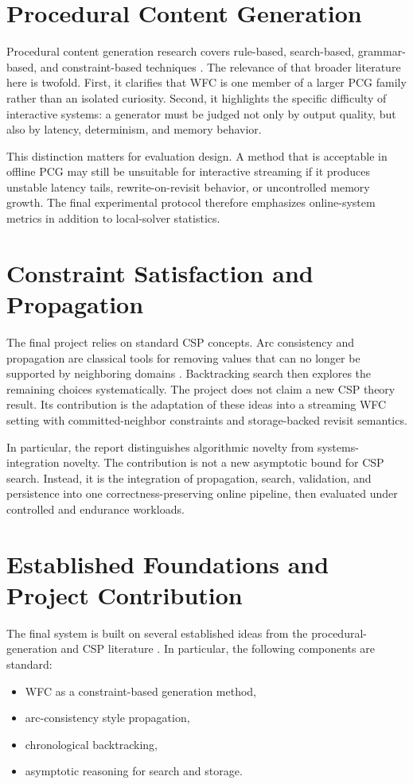 \documentclass[12pt,a4paper]{report}
\begin{document}
\section{Procedural Content Generation}
Procedural content generation research covers rule-based, search-based, grammar-based, and constraint-based techniques \cite{shaker2016pcg}. The relevance of that broader literature here is twofold. First, it clarifies that WFC is one member of a larger PCG family rather than an isolated curiosity. Second, it highlights the specific difficulty of interactive systems: a generator must be judged not only by output quality, but also by latency, determinism, and memory behavior.

This distinction matters for evaluation design. A method that is acceptable in offline PCG may still be unsuitable for interactive streaming if it produces unstable latency tails, rewrite-on-revisit behavior, or uncontrolled memory growth. The final experimental protocol therefore emphasizes online-system metrics in addition to local-solver statistics.

\section{Constraint Satisfaction and Propagation}
The final project relies on standard CSP concepts. Arc consistency and propagation are classical tools for removing values that can no longer be supported by neighboring domains \cite{mackworth1977consistency,dechter2003constraint}. Backtracking search then explores the remaining choices systematically. The project does not claim a new CSP theory result. Its contribution is the adaptation of these ideas into a streaming WFC setting with committed-neighbor constraints and storage-backed revisit semantics.

In particular, the report distinguishes algorithmic novelty from systems-integration novelty. The contribution is not a new asymptotic bound for CSP search. Instead, it is the integration of propagation, search, validation, and persistence into one correctness-preserving online pipeline, then evaluated under controlled and endurance workloads.

\section{Established Foundations and Project Contribution}
The final system is built on several established ideas from the procedural-generation and CSP literature \cite{gumin2016wfc,karth2017wfcwild,karth2022wfc,mackworth1977consistency,dechter2003constraint,cormen2009clrs}. In particular, the following components are standard:
\begin{itemize}
\item WFC as a constraint-based generation method,
\item arc-consistency style propagation,
\item chronological backtracking,
\item asymptotic reasoning for search and storage.
\end{itemize}
\end{document}
